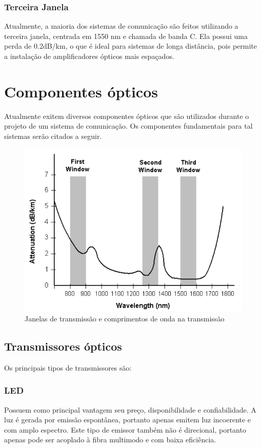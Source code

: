 \documentclass[article]{IEEEtran}
\begin{document}
\subsubsection{Terceira Janela}
Atualmente, a maioria dos sistemas de comunicação são feitos utilizando a terceira janela, centrada em 1550 nm e chamada de banda C. Ela possui uma perda de 0.2dB/km, o que é ideal para sistemas de longa distância, pois permite a instalação de amplificadores ópticos mais espaçados.
\section{Componentes ópticos}
Atualmente exitem diversos componentes ópticos que são utilizados durante o projeto de um sistema de comunicação. Os componentes fundamentais para tal sistemas serão citados a seguir.

\begin{figure}[h]
\includegraphics[width=\columnwidth]{windows.png}
\caption{Janelas de transmissão e comprimentos de onda na transmissão}
\end{figure}


\subsection{Transmissores ópticos}
Os principais tipos de transmissores são:
\subsubsection{LED}
Possuem como principal vantagem seu preço, disponibilidade e confiabilidade. A luz é gerada por emissão espontânea, portanto apenas emitem luz incoerente e com amplo espectro. Este tipo de emissor também não é direcional, portanto apenas pode ser acoplado à fibra multimodo e com baixa eficiência.\cite{TRANSMITTERS}
\end{document}
